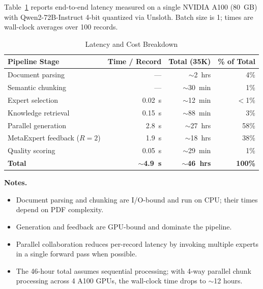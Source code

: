 Table~\ref{tab:latency} reports end-to-end latency measured on a single NVIDIA A100 (80~GB) with Qwen2-72B-Instruct 4-bit quantized via Unsloth. Batch size is 1; times are wall-clock averages over 100 records.

\begin{table}[h]
\centering
\caption{Latency and Cost Breakdown}
\label{tab:latency}
\small
\begin{tabular}{@{}lrrr@{}}
\toprule
\textbf{Pipeline Stage} & \textbf{Time / Record} & \textbf{Total (35K)} & \textbf{\% of Total} \\
\midrule
Document parsing & --- & $\sim$2~hrs & 4\% \\
Semantic chunking & --- & $\sim$30~min & 1\% \\
Expert selection & 0.02~s & $\sim$12~min & $<$1\% \\
Knowledge retrieval & 0.15~s & $\sim$88~min & 3\% \\
Parallel generation & 2.8~s & $\sim$27~hrs & 58\% \\
MetaExpert feedback ($R=2$) & 1.9~s & $\sim$18~hrs & 38\% \\
Quality scoring & 0.05~s & $\sim$29~min & 1\% \\
\midrule
\textbf{Total} & \textbf{$\sim$4.9~s} & \textbf{$\sim$46~hrs} & \textbf{100\%} \\
\bottomrule
\end{tabular}
\end{table}

\noindent\textbf{Notes.}
\begin{itemize}[noitemsep]
    \item Document parsing and chunking are I/O-bound and run on CPU; their times depend on PDF complexity.
    \item Generation and feedback are GPU-bound and dominate the pipeline.
    \item Parallel collaboration reduces per-record latency by invoking multiple experts in a single forward pass when possible.
    \item The 46-hour total assumes sequential processing; with 4-way parallel chunk processing across 4 A100 GPUs, the wall-clock time drops to $\sim$12 hours.
\end{itemize}
